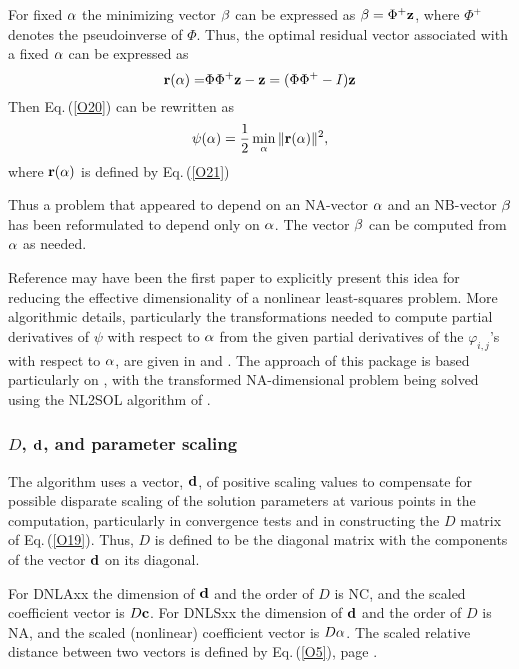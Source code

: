\documentclass[twoside]{MATH77}
\begin{document}
For fixed ${\bf \alpha }$ the minimizing vector ${\bf \beta }$ can be
expressed as ${\bf \beta }=\Phi ^{+}{\bf z}$, where $\Phi ^{+}$ denotes the
pseudoinverse of $\Phi $. Thus, the optimal residual vector associated with
a fixed ${\bf \alpha }$ can be expressed as
\begin{equation}
\label{O21}{\bf r}({\bf \alpha )=}\Phi \Phi ^{+}{\bf z}-{\bf z}=(\Phi \Phi
^{+}-I){\bf z}
\end{equation}
Then Eq.\,(\ref{O20}) can be rewritten as
\begin{equation}
\label{O22}\psi (\alpha )=\frac 12\min _\alpha \|{\bf r}({\bf \alpha })\|^2,
\end{equation}
where ${\bf r}({\bf \alpha })$ is defined by Eq.\,(\ref{O21})

Thus a problem that appeared to depend on an NA-vector ${\bf \alpha }$ and
an NB-vector ${\bf \beta }$ has been reformulated to depend only on ${\bf %
\alpha }$. The vector ${\bf \beta }$ can be computed from ${\bf \alpha }$ as
needed.

Reference \cite{Lawton:1971:ELP} may have been the first paper to
explicitly present this idea for reducing the effective dimensionality of
a nonlinear least-squares problem.  More algorithmic details, particularly
the transformations needed to compute partial derivatives of $\psi $ with
respect to ${\bf \alpha }$ from the given partial derivatives of the
$\varphi _{i,j}$'s with respect to ${\bf \alpha }$, are given in
\cite{Golub:1973:TDP} and \cite{Kaufman:1975:AVP}.  The approach of this
package is based particularly on \cite{Kaufman:1975:AVP}, with the
transformed NA-dimensional problem being solved using the NL2SOL algorithm
of \cite{Dennis:1981:ANL}.

\subsubsection{$D$, ${\bf d}$, and parameter scaling}

The algorithm uses a vector, ${\bf d}$, of positive scaling values to compensate for
possible disparate scaling of the solution parameters at various points in
the computation, particularly in convergence tests and in constructing the $D$
matrix of Eq.\,(\ref{O19}). Thus, $D$ is defined to be the diagonal matrix with
the components of the vector ${\bf d}$ on its diagonal.

For DNLAxx the dimension of ${\bf d}$ and the order of $D$ is NC, and the
scaled coefficient vector is $D{\bf c}$. For DNLSxx the dimension of ${\bf d}$
and the order of $D$ is NA, and the scaled (nonlinear)
coefficient vector is $D{\bf \alpha }$.  The scaled relative distance
between two vectors is defined by Eq.\,(\ref{O5}), page \pageref{O5}.
\end{document}
